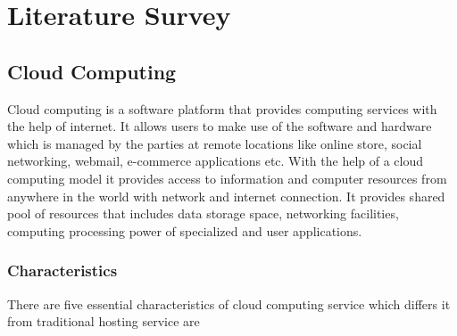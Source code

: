 \chapter{Literature Survey}

\section{Cloud Computing}

\par Cloud computing is a software platform that provides computing services with the help of internet. It allows users to make use of the software and hardware which is managed by the parties at remote locations like online store, social networking, webmail, e-commerce applications etc. With the help of a cloud computing model it provides access to information and computer resources from anywhere in the world with network and internet connection. It provides shared pool of resources that includes data storage space, networking facilities, computing processing power of specialized and user applications\cite{deploy}.%

\subsection{Characteristics}
There are five essential characteristics of cloud computing service which differs it from traditional hosting service are

